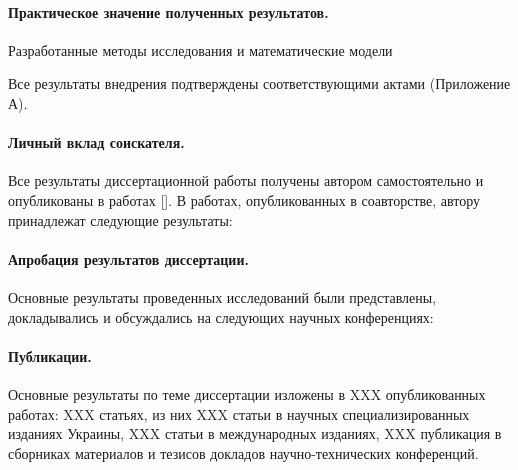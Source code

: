 \paragraph{Практическое значение полученных результатов.}
Разработанные методы исследования и математические модели

Все результаты внедрения подтверждены соответствующими актами
(Приложение А).

\paragraph{Личный вклад соискателя.}
Все результаты диссертационной работы
получены автором самостоятельно и опубликованы в работах [].
В работах, опубликованных в соавторстве, автору
принадлежат следующие результаты:


\paragraph{Апробация результатов диссертации.}
Основные результаты проведенных исследований были представлены, докладывались и
обсуждались на следующих научных конференциях:

\paragraph{Публикации.}
Основные результаты по теме диссертации изложены в XXX
опубликованных работах: XXX статьях, из них XXX статьи в научных
специализированных изданиях Украины, XXX статьи в международных изданиях,
XXX публикация в сборниках материалов и тезисов докладов научно-технических
конференций.




